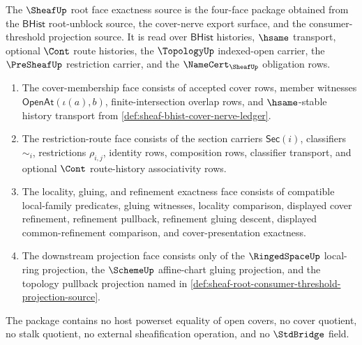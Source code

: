 \begin{definition}
\label{def:sheaf-root-face-exactness-source}
The $\SheafUp$ root face exactness source is the four-face package obtained from the $\mathsf{BHist}$ root-unblock source, the cover-nerve export surface, and the consumer-threshold projection source. It is read over $\mathsf{BHist}$ histories, $\hsame$ transport, optional $\Cont$ route histories, the $\TopologyUp$ indexed-open carrier, the $\PreSheafUp$ restriction carrier, and the $\NameCert_{\SheafUp}$ obligation rows.
\begin{enumerate}
\item The cover-membership face consists of accepted cover rows, member witnesses $\mathsf{OpenAt}(\iota(a),b)$, finite-intersection overlap rows, and $\hsame$-stable history transport from \autoref{def:sheaf-bhist-cover-nerve-ledger}.
\item The restriction-route face consists of the section carriers $\mathsf{Sec}(i)$, classifiers $\sim_i$, restrictions $\rho_{i,j}$, identity rows, composition rows, classifier transport, and optional $\Cont$ route-history associativity rows.
\item The locality, gluing, and refinement exactness face consists of compatible local-family predicates, gluing witnesses, locality comparison, displayed cover refinement, refinement pullback, refinement gluing descent, displayed common-refinement comparison, and cover-presentation exactness.
\item The downstream projection face consists only of the $\RingedSpaceUp$ local-ring projection, the $\SchemeUp$ affine-chart gluing projection, and the topology pullback projection named in \autoref{def:sheaf-root-consumer-threshold-projection-source}.
\end{enumerate}
The package contains no host powerset equality of open covers, no cover quotient, no stalk quotient, no external sheafification operation, and no $\StdBridge$ field.
\end{definition}

